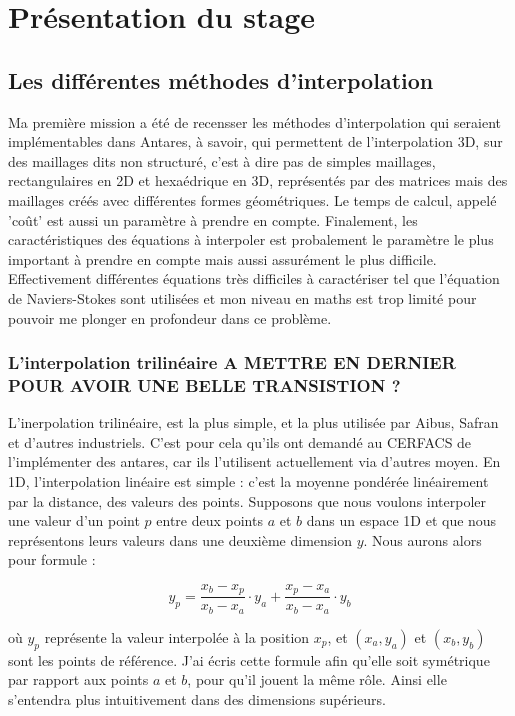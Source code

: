 \chapter{Présentation du stage}

\section{Les différentes méthodes d'interpolation}
Ma première mission a été de recensser les méthodes d'interpolation qui seraient implémentables dans Antares, à savoir, qui
permettent de l'interpolation 3D, sur des maillages dits non structuré, c'est à dire pas de simples maillages, rectangulaires
en 2D et hexaédrique en 3D, représentés par des matrices mais des maillages créés avec différentes formes géométriques.
Le temps de calcul, appelé 'coût' est aussi un paramètre à prendre en compte.
Finalement, les caractéristiques des équations à interpoler est probalement le paramètre le plus important à prendre en
compte mais aussi assurément le plus difficile. Effectivement différentes équations très difficiles à caractériser tel que
l'équation de Naviers-Stokes sont utilisées et mon niveau en maths est trop limité pour pouvoir me plonger en profondeur dans
ce problème.


\subsection{L'interpolation trilinéaire   A METTRE EN DERNIER POUR AVOIR UNE BELLE TRANSISTION ?}
L'inerpolation trilinéaire, est la plus simple, et la plus utilisée par Aibus, Safran et d'autres industriels.
C'est pour cela qu'ils ont demandé au CERFACS de l'implémenter des antares, car ils l'utilisent actuellement via d'autres moyen.
En 1D, l'interpolation linéaire est simple : c'est la moyenne pondérée linéairement par la distance, des valeurs des points.
Supposons que nous voulons interpoler une valeur d'un point \( p \) entre deux points \( a \) et \( b \) dans un espace 1D
et que nous représentons leurs valeurs dans une deuxième dimension \( y \).
Nous aurons alors pour formule :

\[
y_p = \frac{x_b - x_p}{x_b - x_a} \cdot y_a + \frac{x_p - x_a}{x_b - x_a} \cdot y_b
\]

où \( y_p \) représente la valeur interpolée à la position \( x_p \), et \((x_a, y_a)\) et \((x_b, y_b)\) sont les points de référence. J'ai écris cette formule afin qu'elle soit symétrique par rapport aux points \( a \) et \( b \), pour qu'il jouent la même rôle. Ainsi elle s'entendra plus intuitivement dans des dimensions supérieurs.

